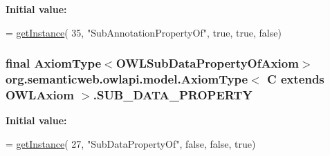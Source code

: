 {\bfseries Initial value\-:}
\begin{DoxyCode}
= \hyperlink{classorg_1_1semanticweb_1_1owlapi_1_1model_1_1_axiom_type_3_01_c_01extends_01_o_w_l_axiom_01_4_a485e011845434c518471707a87f09339}{getInstance}(
            35, \textcolor{stringliteral}{"SubAnnotationPropertyOf"}, \textcolor{keyword}{true}, \textcolor{keyword}{true}, \textcolor{keyword}{false})
\end{DoxyCode}
\hypertarget{classorg_1_1semanticweb_1_1owlapi_1_1model_1_1_axiom_type_3_01_c_01extends_01_o_w_l_axiom_01_4_acd8133e3266e30cf98466d8fd7b3fe5c}{
\subsubsection[{S\-U\-B\-\_\-\-D\-A\-T\-A\-\_\-\-P\-R\-O\-P\-E\-R\-T\-Y}]{\setlength{\rightskip}{0pt plus 5cm}final {\bf Axiom\-Type}$<${\bf O\-W\-L\-Sub\-Data\-Property\-Of\-Axiom}$>$ org.\-semanticweb.\-owlapi.\-model.\-Axiom\-Type$<$ C extends {\bf O\-W\-L\-Axiom} $>$.S\-U\-B\-\_\-\-D\-A\-T\-A\-\_\-\-P\-R\-O\-P\-E\-R\-T\-Y\hspace{0.3cm}{\ttfamily [static]}}}\label{classorg_1_1semanticweb_1_1owlapi_1_1model_1_1_axiom_type_3_01_c_01extends_01_o_w_l_axiom_01_4_acd8133e3266e30cf98466d8fd7b3fe5c}
{\bfseries Initial value\-:}
\begin{DoxyCode}
= \hyperlink{classorg_1_1semanticweb_1_1owlapi_1_1model_1_1_axiom_type_3_01_c_01extends_01_o_w_l_axiom_01_4_a485e011845434c518471707a87f09339}{getInstance}(
            27, \textcolor{stringliteral}{"SubDataPropertyOf"}, \textcolor{keyword}{false}, \textcolor{keyword}{false}, \textcolor{keyword}{true})
\end{DoxyCode}
